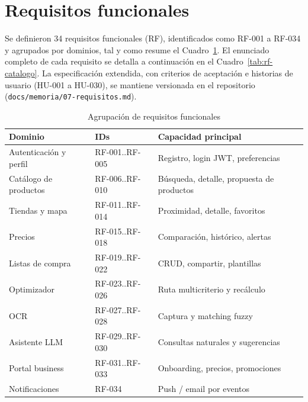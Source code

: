\section{Requisitos funcionales}

Se definieron 34 requisitos funcionales (RF), identificados como RF-001 a RF-034 y agrupados por
dominios, tal y como resume el Cuadro~\ref{tab:rf-grupos}. El enunciado completo de cada requisito
se detalla a continuaci\'on en el Cuadro~\ref{tab:rf-catalogo}. La especificaci\'on extendida, con
criterios de aceptaci\'on e historias de usuario (HU-001 a HU-030), se mantiene versionada en el
repositorio (\texttt{docs/memoria/07-requisitos.md}).

\begin{table}[htbp]
\centering
\caption{Agrupaci\'on de requisitos funcionales}
\label{tab:rf-grupos}
\small
\begin{tabular}{@{}lll@{}}
\toprule
\textbf{Dominio} & \textbf{IDs} & \textbf{Capacidad principal} \\
\midrule
Autenticaci\'on y perfil & RF-001..RF-005 & Registro, login JWT, preferencias \\
Cat\'alogo de productos & RF-006..RF-010 & B\'usqueda, detalle, propuesta de productos \\
Tiendas y mapa & RF-011..RF-014 & Proximidad, detalle, favoritos \\
Precios & RF-015..RF-018 & Comparaci\'on, hist\'orico, alertas \\
Listas de compra & RF-019..RF-022 & CRUD, compartir, plantillas \\
Optimizador & RF-023..RF-026 & Ruta multicriterio y rec\'alculo \\
OCR & RF-027..RF-028 & Captura y matching fuzzy \\
Asistente LLM & RF-029..RF-030 & Consultas naturales y sugerencias \\
Portal business & RF-031..RF-033 & Onboarding, precios, promociones \\
Notificaciones & RF-034 & Push / email por eventos \\
\bottomrule
\end{tabular}
\end{table}

